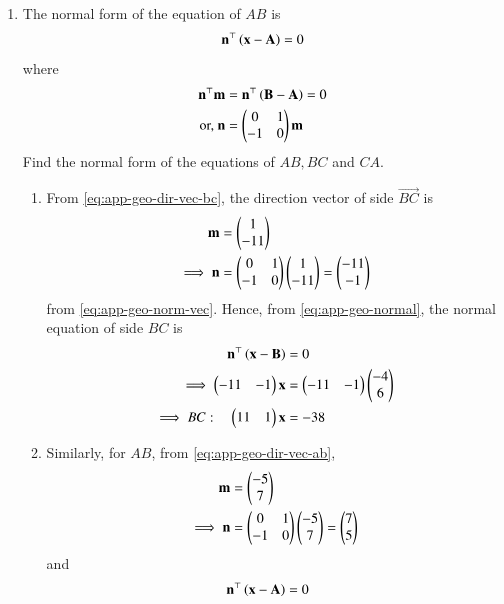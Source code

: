 \begin{enumerate}[label=\thesubsection.\arabic*.,ref=\thesubsection.\theenumi]
%		
\item The normal form of the equation of $AB$  is 
		\begin{align}
			\label{eq:app-geo-normal}
			\mathbf{n}^{\top}\left(	\mathbf{x}-\mathbf{A}\right) = 0
		\end{align}
		where 
		\begin{align}
			\mathbf{n}^{\top}\mathbf{m}&=\mathbf{n}^{\top}\left(\mathbf{B}-\mathbf{A}\right) = 0
			\\
			\text{or, } \mathbf{n}&=\begin{pmatrix}0 & 1 \\ -1 & 0\end{pmatrix} \mathbf{m}
			\label{eq:app-geo-norm-vec}
		\end{align}
Find the normal form of the equations of $AB, BC$ and $CA$.
\\
\solution
\begin{enumerate}
	\item
From
		\eqref{eq:app-geo-dir-vec-bc}, 
the direction vector of side $\vec{BC}$ is
\begin{align}
\mathbf{m}
	&=\begin{pmatrix}1\\-11\end{pmatrix}
	\\
\implies \mathbf{n} &= \begin{pmatrix}0 & 1\\
  -1 & 0\end{pmatrix}\begin{pmatrix}1\\-11\end{pmatrix}
 = \begin{pmatrix}-11\\-1\end{pmatrix}
		\label{eq:app-geo-norm-vec-bc}
\end{align}
from 
			\eqref{eq:app-geo-norm-vec}.
Hence, from 
			\eqref{eq:app-geo-normal},
the normal equation of side $BC$ is 
\begin{align}
	\mathbf{n}^{\top}\left(	\mathbf{x}-\mathbf{B}\right) &= 0
			\\
\implies    \begin{pmatrix}-11 & -1\end{pmatrix}\mathbf{x}&=\begin{pmatrix}-11 & -1\end{pmatrix}\begin{pmatrix}-4\\6\end{pmatrix}\\
    \implies
BC: \quad    \begin{pmatrix}11 & 1\end{pmatrix}\mathbf{x}&=-38
\end{align}
\item Similarly, for $AB$,
from 
		\eqref{eq:app-geo-dir-vec-ab}, 
\begin{align}
	\mathbf{m} &= \begin{pmatrix}-5\\7\end{pmatrix}
	\\
\implies        \mathbf{n} 
                &= \begin{pmatrix}0&1\\-1&0\end{pmatrix}\begin{pmatrix}-5\\7\end{pmatrix}
                = \begin{pmatrix}7\\5\end{pmatrix}
		\label{eq:app-geo-norm-vec-ab}
\end{align}
and 
\begin{align}
	\vec{n}^{\top}\brak{	\vec{x}-\vec{A}} &= 0

\end{align}
\end{enumerate}
\end{enumerate}
